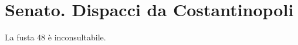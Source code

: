 \def\fondo{senato-dispacci-costantinopoli}
\chapter{Senato. Dispacci da Costantinopoli}

La fusta 48 è inconsultabile.





